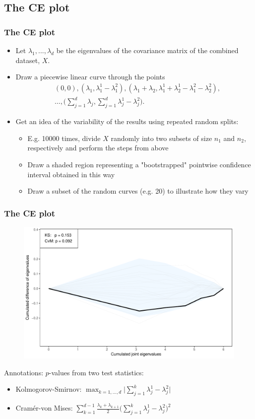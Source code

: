 \documentclass[a4]{beamer}
\begin{document}
\subsection{The CE plot}
\begin{frame}
\frametitle{The CE plot}
\begin{itemize}
\item Let $\lambda_1, ..., \lambda_d$ be the eigenvalues of the covariance matrix of the combined dataset, $X$. 
\item Draw a piecewise linear curve through the points
\begin{align*}
&(0,0), 
(\lambda_1,\lambda^1_1-\lambda^2_1), 
(\lambda_1 + \lambda_2,\lambda^1_1+\lambda^1_2-\lambda^2_1-\lambda^2_2), \\ 
&\ldots, \bigg( \sum_{j=1}^d \lambda_j, \sum_{j=1}^d \lambda^1_j - \lambda^2_j \bigg).
\end{align*}
\item Get an idea of the variability of the results using repeated random splits:
\begin{itemize}
\item E.g. 10000 times, divide $X$ randomly into two subsets of size $n_1$ and $n_2$, respectively and perform the steps from above
\item Draw a shaded region representing a "bootstrapped" pointwise confidence interval obtained in this way
\item Draw a subset of the random curves (e.g. 20) to illustrate how they vary
\end{itemize}
\end{itemize}
\end{frame}

\begin{frame}
\frametitle{The CE plot}
\begin{figure}
\centering
    \includegraphics[scale = 0.3]{essDKSEce.pdf}
\end{figure}
\small
Annotations: $p$-values from two test statistics:
\begin{itemize}
\item Kolmogorov-Smirnov: $\max_{k=1,\dotsc,d} \bigg\lvert \sum_{j=1}^k \lambda^1_j -  \lambda^2_j \bigg\rvert$
\item Cramér-von Mises: $\sum_{k=1}^{d-1} \frac{\lambda_k + \lambda_{k+1}}{2} \bigg( \sum_{j=1}^k \lambda^1_j - \lambda^2_j  \bigg)^2$
\end{itemize}
\end{frame}
\end{document}
